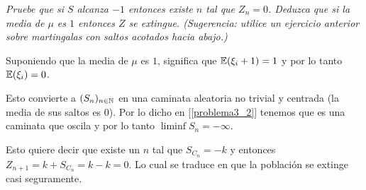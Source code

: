 \emph{
    Pruebe que si $S$ alcanza $-1$ entonces existe $n$ tal que $Z_n=0$. 
    Deduzca que si la media de $\mu$ es $1$ entonces $Z$ se extingue. 
    (Sugerencia: utilice un ejercicio anterior sobre martingalas con saltos acotados hacia abajo.) 
}

\afterstatement\par\null

Suponiendo que la media de $\mu$ es $1$, significa que $\mathbb{E}(\xi_i + 1) = 1$ y por lo tanto $\mathbb{E}(\xi_i) = 0$.\par\null

Esto convierte a $(S_n)_{n \in \mathbb{N}}$ en una caminata aleatoria no trivial y centrada (la media de sus saltos es 0).
Por lo dicho en [\ref{problema3_2}] tenemos que es una caminata que oscila y por lo tanto $\liminf S_n = -\infty$.\par\null

Esto quiere decir que existe un $n$ tal que $S_{C_{n}} = -k$ y entonces 
$Z_{n + 1} = k + S_{C_{n}} = k - k = 0$. Lo cual se traduce en que la población se extinge casi seguramente.\par\null